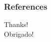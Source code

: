 \documentclass{beamer}
\begin{document}
\begin{frame}[allowframebreaks]
  \frametitle{References}
  \footnotesize
  
  
\end{frame}

\begin{frame}
  \begin{center}
    \Huge
    Thanks! \\
    Obrigado!
  \end{center}
\end{frame}
\end{document}
